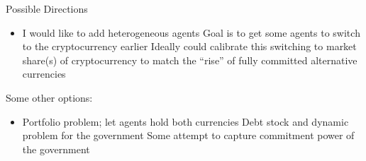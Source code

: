 \documentclass[dvipsnames]{beamer}
\begin{document}
%
\begin{frame}{Possible Directions}
  \begin{itemize}
  \item I would like to add heterogeneous agents
    \vitem Goal is to get some agents to switch to the cryptocurrency earlier
    \vitem Ideally could calibrate this switching to market share(s) of cryptocurrency to match the ``rise'' of fully committed alternative currencies
  \end{itemize}
  \vfill
  Some other options:
  \begin{itemize}
  \item Portfolio problem; let agents hold both currencies
    \vitem Debt stock and dynamic problem for the government
    \vitem Some attempt to capture commitment power of the government
  \end{itemize}
\end{frame}
\end{document}
